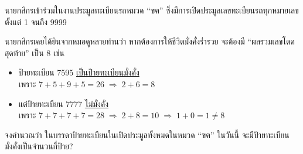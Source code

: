 \question{}

นายกสิกรเข้าร่วมในงานประมูลทะเบียนรถหมวด ``ฃฅ'' 
ซึ่งมีการเปิดประมูลเลขทะเบียนรถทุกหมายเลข ตั้งแต่ 1 จนถึง 9999

นายกสิกรเคยได้ยินจากหมอดูหลายท่านว่า หากต้องการให้ชีวิตมั่งคั่งร่ำรวย จะต้องมี ``ผลรวมเลขโดดสุดท้าย''\hrsp%
เป็น 8 เช่น
\begin{itemize}[before*=\small]
    \item ป้ายทะเบียน 7595 \uline{เป็นป้ายทะเบียนมั่งคั่ง} \\
        เพราะ $\mathrm{7 + 5 + 9 + 5 = 26} \;\Longrightarrow\; \mathrm{2 + 6 = 8}$
    \item แต่ป้ายทะเบียน 7777 \uline{ไม่มั่งคั่ง} \\
        เพราะ $\mathrm{7 + 7 + 7 + 7 = 28} \;\Longrightarrow\; \mathrm{2 + 8 = 10} \;\Longrightarrow\; \mathrm{1 + 0 = 1 \neq 8}$
\end{itemize}

จงคำนวณว่า ในบรรดาป้ายทะเบียนในเปิดประมูลทั้งหมดในหมวด ``ฃฅ'' ในวันนี้ 
จะมีป้ายทะเบียนมั่งคั่งเป็นจำนวนกี่ป้าย?
